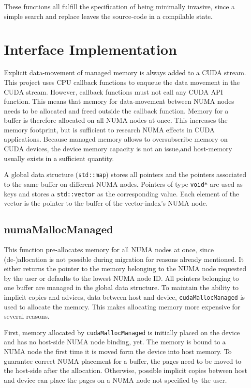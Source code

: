 These functions all fulfill the specification of being minimally invasive, since
a simple search and replace leaves the source-code in a compilable state.

\section{Interface Implementation}
Explicit data-movement of managed memory is always added to a CUDA stream. This project uses CPU callback functions to enqueue the data movement in the CUDA stream. However, callback functions must not
call any CUDA API function. This means that memory for data-movement between NUMA nodes needs to be allocated and freed outside the callback function.
Memory for a buffer is therefore allocated on all NUMA nodes at once. This increases the memory footprint, but is 
sufficient to research NUMA effects in CUDA applications. Because managed memory
allows to oversubscribe memory on CUDA devices, the device memory capacity is not 
an issue,and host-memory usually exists in a sufficient quantity.

A global data structure (\verb|std::map|) stores all pointers and the pointers associated to the same buffer on different NUMA nodes.
Pointers of type \verb|void*| are used as keys and stores a \verb|std::vector| as the corresponding value. Each element of the vector 
is the pointer to the buffer of the vector-index's NUMA node.

\subsection*{numaMallocManaged}
This function pre-allocates memory for all NUMA nodes at once, since (de-)allocation is not possible during migration for reasons already mentioned. It either returns the pointer to the memory belonging to the NUMA node requested by the user or defaults to the lowest NUMA node ID. All pointers belonging to one buffer are managed in the global data structure.
To maintain the ability to implicit copies and advices, data between host and device, \verb|cudaMallocManaged| is used to allocate the memory. This makes allocating memory more expensive for several reasons.

First, memory allocated by \verb|cudaMallocManaged| is initially placed on the device and has no host-side NUMA node binding, yet. The memory is bound to a NUMA node the first time it is moved
form the device into host memory. To guarantee correct NUMA placement for a buffer, the pages need to be moved to the host-side after the allocation.
Otherwise, possible implicit copies between host and device can place the pages on a NUMA node not specified by the user.

